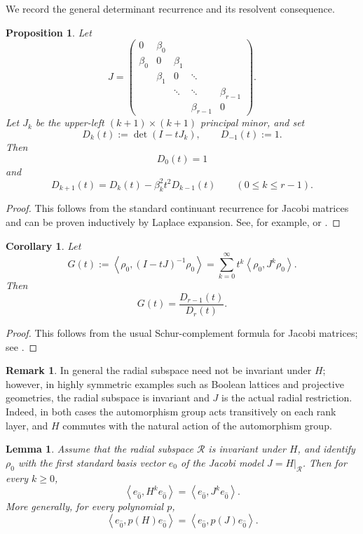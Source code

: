\documentclass[11pt]{amsart}
\newtheorem{lem}[thm]{Lemma}
\newtheorem{prop}[thm]{Proposition}
\newtheorem{cor}[thm]{Corollary}
\theoremstyle{definition}
\newtheorem{remark}[thm]{Remark}
\newcommand{\cc}{\mathcal}
\newcommand{\ip}[2]{\left\langle #1, #2 \right\rangle}
\newcommand{\zero}{\hat{0}}
\begin{document}
We record the general determinant recurrence and its resolvent consequence.

\begin{prop}\label{prop:det-rec}
Let
\[
J=
\begin{pmatrix}
0 & \beta_0 \\
\beta_0 & 0 & \beta_1 \\
& \beta_1 & 0 & \ddots \\
&& \ddots & \ddots & \beta_{r-1}\\
&&& \beta_{r-1} & 0
\end{pmatrix}.
\]
Let $J_k$ be the upper-left $(k+1)\times (k+1)$ principal minor, and set
\[
D_k(t):=\det(I-tJ_k),\qquad D_{-1}(t):=1.
\]
Then
\[
D_0(t)=1
\]
and
\[
D_{k+1}(t)=D_k(t)-\beta_k^2 t^2 D_{k-1}(t)
\qquad (0\le k\le r-1).
\]
\end{prop}

\begin{proof}
This follows from the standard continuant recurrence for Jacobi matrices and can be proven inductively by Laplace expansion. See, for example, \cite[Exercise I.5.7]{Chihara} or \cite{ReedSimon-IV}.
\end{proof}

\begin{cor}\label{prop:resolvent}
Let
\[
G(t):=\ip{\rho_0}{(I-tJ)^{-1}\rho_0} = \sum_{k=0}^\infty t^k\ip{\rho_0}{J^k\rho_0}.
\]
Then
\[
G(t)=\frac{D_{r-1}(t)}{D_r(t)}.
\]
\end{cor}

\begin{proof}
This follows from the usual Schur-complement formula for Jacobi matrices; see \cite{ReedSimon-IV}.
\end{proof}

\begin{remark}
    In general the radial subspace need not be invariant under $H$; however, in highly symmetric examples such as Boolean lattices and projective geometries, the radial subspace is invariant and $J$ is the actual radial restriction. Indeed, in both cases the automorphism group acts transitively on each rank layer, and $H$ commutes with the natural action of the automorphism group.
\end{remark}

\begin{lem}\label{lem:vacuum-moment-compression}
Assume that the radial subspace $\cc R$ is invariant under $H$, and identify $\rho_0$ with the
first standard basis vector $e_0$ of the Jacobi model $J=H|_{\cc R}$.  Then for every $k\ge 0$,
\[
\ip{e_{\zero}}{H^k e_{\zero}}=\ip{e_{\zero}}{J^k e_{\zero}}.
\]
More generally, for every polynomial $p$,
\[
\ip{e_{\zero}}{p(H)e_{\zero}}=\ip{e_{\zero}}{p(J)e_{\zero}}.
\]
\end{lem}
\end{document}
